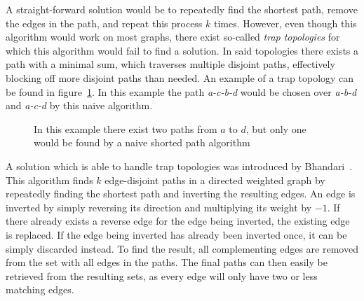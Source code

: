 A straight-forward solution would be to repeatedly find the shortest path, remove the edges in the path, and repeat this process $k$ times. However, even though this algorithm would work on most graphs, there exist so-called \textit{trap topologies} for which this algorithm would fail to find a solution. In said topologies there exists a path with a minimal sum, which traverses multiple disjoint paths, effectively blocking off more disjoint paths than needed. An example of a trap topology can be found in figure~\ref{contr:trap-topology}. In this example the path \textit{a-c-b-d} would be chosen over \textit{a-b-d} and \textit{a-c-d} by this naive algorithm.


\begin{figure}[h]
    \centering
    \caption{In this example there exist two paths from $a$ to $d$, but only one would be found by a naive shorted path algorithm}
    \label{contr:trap-topology}
\end{figure}

A solution which is able to handle trap topologies was introduced by Bhandari~\cite{bhandari}. This algorithm finds $k$ edge-disjoint paths in a directed weighted graph by repeatedly finding the shortest path and inverting the resulting edges. An edge is inverted by simply reversing its direction and multiplying its weight by $-1$. If there already exists a reverse edge for the edge being inverted, the existing edge is replaced. If the edge being inverted has already been inverted once, it can be simply discarded instead.
To find the result, all complementing edges are removed from the set with all edges in the paths. The final paths can then easily be retrieved from the resulting sets, as every edge will only have two or less matching edges.

